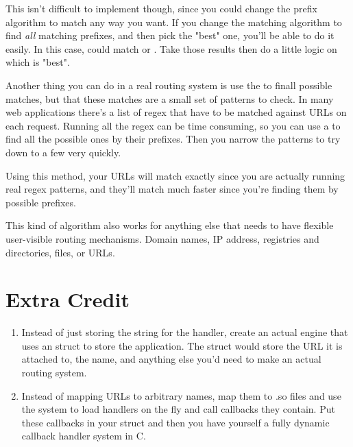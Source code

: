 This isn't difficult to implement though, since you could change the prefix
algorithm to match any way you want.  If you change the matching algorithm to
find \emph{all} matching prefixes, and then pick the "best" one, you'll be
able to do it easily.  In this case,  could match 
or .  Take those results then do a little logic on which is "best".

Another thing you can do in a real routing system is use the  to
finall possible matches, but that these matches are a small set of patterns
to check.  In many web applications there's a list of regex that have to be
matched against URLs on each request.  Running all the regex can be time
consuming, so you can use a  to find all the possible ones
by their prefixes.  Then you narrow the patterns to try down to a few
very quickly.

Using this method, your URLs will match exactly since you are actually running
real regex patterns, and they'll match much faster since you're finding them
by possible prefixes.

This kind of algorithm also works for anything else that needs to have flexible
user-visible routing mechanisms.  Domain names, IP address, registries and directories,
files, or URLs.

\section{Extra Credit}

\begin{enumerate}
\item Instead of just storing the string for the handler, create an actual engine that uses an
     struct to store the application.  The struct would store the URL it is
    attached to, the name, and anything else you'd need to make an actual routing system.
\item Instead of mapping URLs to arbitrary names, map them to .so files and use the 
    system to load handlers on the fly and call callbacks they contain.  Put these callbacks
    in your  struct and then you have yourself a fully dynamic callback 
    handler system in C.
\end{enumerate}

